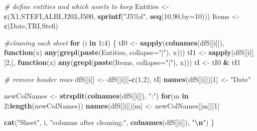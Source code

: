 \documentclass[
  12pt,
]{article}
\newenvironment{Shaded}{\begin{snugshade}}{\end{snugshade}}
\newcommand{\AttributeTok}[1]{\textcolor[rgb]{0.13,0.29,0.53}{#1}}
\newcommand{\CommentTok}[1]{\textcolor[rgb]{0.56,0.35,0.01}{\textit{#1}}}
\newcommand{\ControlFlowTok}[1]{\textcolor[rgb]{0.13,0.29,0.53}{\textbf{#1}}}
\newcommand{\DecValTok}[1]{\textcolor[rgb]{0.00,0.00,0.81}{#1}}
\newcommand{\FunctionTok}[1]{\textcolor[rgb]{0.13,0.29,0.53}{\textbf{#1}}}
\newcommand{\NormalTok}[1]{#1}
\newcommand{\OtherTok}[1]{\textcolor[rgb]{0.56,0.35,0.01}{#1}}
\newcommand{\SpecialCharTok}[1]{\textcolor[rgb]{0.81,0.36,0.00}{\textbf{#1}}}
\newcommand{\StringTok}[1]{\textcolor[rgb]{0.31,0.60,0.02}{#1}}
\begin{document}
\begin{Shaded}
\begin{Highlighting}[]
\CommentTok{\# define entities and which assets to keep}
\NormalTok{Entities }\OtherTok{\textless{}{-}} \FunctionTok{c}\NormalTok{(}\StringTok{\textquotesingle{}X1\textquotesingle{}}\NormalTok{,}\StringTok{\textquotesingle{}STEFI\textquotesingle{}}\NormalTok{,}\StringTok{\textquotesingle{}ALBI\textquotesingle{}}\NormalTok{,}\StringTok{\textquotesingle{}J203\textquotesingle{}}\NormalTok{,}\StringTok{\textquotesingle{}J500\textquotesingle{}}\NormalTok{, }\FunctionTok{sprintf}\NormalTok{(}\StringTok{"J5\%d"}\NormalTok{, }\FunctionTok{seq}\NormalTok{(}\DecValTok{10}\NormalTok{,}\DecValTok{90}\NormalTok{,}\AttributeTok{by=}\DecValTok{10}\NormalTok{)))}
\NormalTok{Items    }\OtherTok{\textless{}{-}} \FunctionTok{c}\NormalTok{(}\StringTok{\textquotesingle{}Date\textquotesingle{}}\NormalTok{,}\StringTok{\textquotesingle{}TRI\textquotesingle{}}\NormalTok{,}\StringTok{\textquotesingle{}Stefi\textquotesingle{}}\NormalTok{)}

\CommentTok{\#cleaning each sheet}
\ControlFlowTok{for}\NormalTok{ (i }\ControlFlowTok{in} \DecValTok{1}\SpecialCharTok{:}\DecValTok{4}\NormalTok{) \{}
\NormalTok{  tI0 }\OtherTok{\textless{}{-}} \FunctionTok{sapply}\NormalTok{(}\FunctionTok{colnames}\NormalTok{(dfS[[i]]), }\ControlFlowTok{function}\NormalTok{(x) }\FunctionTok{any}\NormalTok{(}\FunctionTok{grepl}\NormalTok{(}\FunctionTok{paste}\NormalTok{(Entities, }\AttributeTok{collapse=}\StringTok{"|"}\NormalTok{), x)))}
\NormalTok{  tI1 }\OtherTok{\textless{}{-}} \FunctionTok{sapply}\NormalTok{(dfS[[i]][}\DecValTok{2}\NormalTok{,], }\ControlFlowTok{function}\NormalTok{(x) }\FunctionTok{any}\NormalTok{(}\FunctionTok{grepl}\NormalTok{(}\FunctionTok{paste}\NormalTok{(Items, }\AttributeTok{collapse=}\StringTok{"|"}\NormalTok{), x)))}
\NormalTok{  tI  }\OtherTok{\textless{}{-}}\NormalTok{ tI0 }\SpecialCharTok{\&}\NormalTok{ tI1}
  
  \CommentTok{\# remove header rows}
\NormalTok{  dfS[[i]] }\OtherTok{\textless{}{-}}\NormalTok{ dfS[[i]][}\SpecialCharTok{{-}}\FunctionTok{c}\NormalTok{(}\DecValTok{1}\NormalTok{,}\DecValTok{2}\NormalTok{), tI]}
  \FunctionTok{names}\NormalTok{(dfS[[i]])[}\DecValTok{1}\NormalTok{] }\OtherTok{\textless{}{-}} \StringTok{"Date"}
  
\NormalTok{  newColNames }\OtherTok{\textless{}{-}} \FunctionTok{strsplit}\NormalTok{(}\FunctionTok{colnames}\NormalTok{(dfS[[i]]), }\StringTok{":"}\NormalTok{)}
  \ControlFlowTok{for}\NormalTok{(m }\ControlFlowTok{in} \DecValTok{2}\SpecialCharTok{:}\FunctionTok{length}\NormalTok{(newColNames)) }\FunctionTok{names}\NormalTok{(dfS[[i]])[m] }\OtherTok{\textless{}{-}}\NormalTok{ newColNames[[m]][}\DecValTok{1}\NormalTok{]}
  
  \FunctionTok{cat}\NormalTok{(}\StringTok{"Sheet"}\NormalTok{, i, }\StringTok{"columns after cleaning:"}\NormalTok{, }\FunctionTok{colnames}\NormalTok{(dfS[[i]]), }\StringTok{"}\SpecialCharTok{\textbackslash{}n}\StringTok{"}\NormalTok{)}
\NormalTok{\}}
\end{Highlighting}
\end{Shaded}
\end{document}
